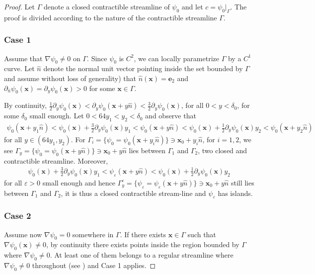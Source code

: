 \documentclass[11pt,reqno]{amsproc}
\newcommand{\x}{\mathbf{x}}
\newcommand{\ve}{\varepsilon}
\numberwithin{equation}{section}
\numberwithin{theorem}{section}
\numberwithin{prop}{section}
\numberwithin{cor}{section}
\numberwithin{lemma}{section}
\theoremstyle{remark}
\theoremstyle{definition}
\begin{document}
\begin{proof}
Let $\Gamma$ denote a closed contractible streamline of $\psi_0$ and let $c=\psi_0|_\Gamma$. The proof is divided according to the nature of the contractible streamline $\Gamma$.
\subsubsection*{Case 1} Assume that $\nabla\psi_0\neq 0$ on $\Gamma$.  Since $\psi_0$ is $C^2$, we can locally parametrize $\Gamma$ by a $C^1$ curve. Let $\hat{n}$ denote the normal unit vector pointing inside the set bounded by $\Gamma$ and assume without loss of generality) that $\hat{n}(\x)=\mathbf{e}_2$ and $\partial_{\hat{n}}\psi_0(\x)=\partial_y\psi_0(\x) > 0$ for some $\x\in \Gamma$. 

By continuity, $\frac12\partial_y\psi_0(\x) < \partial_y\psi_0(\x+y\hat{n}) < \frac32\partial_y\psi_0(\x)$, for all $0 < y < \delta_0$, for some $\delta_0$ small enough. Let $0 < 64y_1 < y_2 < \delta_0$ and observe that 
\begin{align*}
\psi_0(\x+y_1\hat{n}) < \psi_0(\x) + \frac32\partial_y\psi_0(\x) y_1 < \psi_0(\x + y\hat{n}) < \psi_0(\x) + \frac12\partial_y\psi_0(\x) y_2 < \psi_0(\x+y_2\hat{n})
\end{align*}
for all $y\in (64y_1,y_2)$. For $\Gamma_i = \lbrace \psi_0=\psi_0(\x+y_i\hat{n})\rbrace \ni \x_0+y_i\hat{n} $, for $i=1,2$, we see $\Gamma_y = \lbrace \psi_0=\psi_0(\x+y\hat{n})\rbrace \ni \x_0+y\hat{n}$ lies between $\Gamma_1$ and $\Gamma_2$, two closed and contractible streamline.  Moreover, 
\begin{align*}
 \psi_0(\x) + \frac32\partial_y\psi_0(\x) y_1 < \psi_\ve(\x + y\hat{n}) < \psi_0(\x) + \frac12\partial_y\psi_0(\x) y_2 
\end{align*}
for all $\ve>0$ small enough and hence $\Gamma_y^\ve = \lbrace \psi_\ve=\psi_\ve(\x+y\hat{n})\rbrace \ni \x_0+y\hat{n}$ still lies between $\Gamma_1$ and $\Gamma_2$, it is thus a closed contractible stream-line and $\psi_\ve$ has islands.

\subsubsection*{Case 2} Assume now $\nabla\psi_0=0$ somewhere in $\Gamma$. If there exists $\x\in \Gamma$ such that $\nabla\psi_0(\x)\neq 0$, by continuity there exists points inside the region bounded by $\Gamma$ where $\nabla\psi_0\neq 0$. At least one of them belongs to a regular streamline where $\nabla\psi_0\neq 0$ throughout (see \cite[Lemma 2.1]{drivas2024geometric}) and Case 1 applies.


\end{proof}
\end{document}

